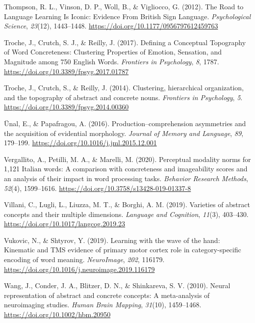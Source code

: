 \documentclass[
  man,floatsintext]{apa6}
\newlength{\cslhangindent}
\newenvironment{CSLReferences}[2] %
 {\begin{list}{}{%
  \setlength{\itemindent}{0pt}
  \setlength{\leftmargin}{0pt}
  \setlength{\parsep}{0pt}
  \ifodd #1
   \setlength{\leftmargin}{\cslhangindent}
   \setlength{\itemindent}{-1\cslhangindent}
  \fi
  \setlength{\itemsep}{#2\baselineskip}}}
 {\end{list}}
\begin{document}
\begin{CSLReferences}{1}{0}
Thompson, R. L., Vinson, D. P., Woll, B., \& Vigliocco, G. (2012). The {Road} to {Language Learning Is Iconic}: {Evidence From British Sign Language}. \emph{Psychological Science}, \emph{23}(12), 1443--1448. \url{https://doi.org/10.1177/0956797612459763}

Troche, J., Crutch, S. J., \& Reilly, J. (2017). Defining a {Conceptual Topography} of {Word Concreteness}: {Clustering Properties} of {Emotion}, {Sensation}, and {Magnitude} among 750 {English Words}. \emph{Frontiers in Psychology}, \emph{8}, 1787. \url{https://doi.org/10.3389/fpsyg.2017.01787}

Troche, J., Crutch, S., \& Reilly, J. (2014). Clustering, hierarchical organization, and the topography of abstract and concrete nouns. \emph{Frontiers in Psychology}, \emph{5}. \url{https://doi.org/10.3389/fpsyg.2014.00360}

Ünal, E., \& Papafragou, A. (2016). Production--comprehension asymmetries and the acquisition of evidential morphology. \emph{Journal of Memory and Language}, \emph{89}, 179--199. \url{https://doi.org/10.1016/j.jml.2015.12.001}

Vergallito, A., Petilli, M. A., \& Marelli, M. (2020). Perceptual modality norms for 1,121 {Italian} words: {A} comparison with concreteness and imageability scores and an analysis of their impact in word processing tasks. \emph{Behavior Research Methods}, \emph{52}(4), 1599--1616. \url{https://doi.org/10.3758/s13428-019-01337-8}

Villani, C., Lugli, L., Liuzza, M. T., \& Borghi, A. M. (2019). Varieties of abstract concepts and their multiple dimensions. \emph{Language and Cognition}, \emph{11}(3), 403--430. \url{https://doi.org/10.1017/langcog.2019.23}

Vukovic, N., \& Shtyrov, Y. (2019). Learning with the wave of the hand: {Kinematic} and {TMS} evidence of primary motor cortex role in category-specific encoding of word meaning. \emph{NeuroImage}, \emph{202}, 116179. \url{https://doi.org/10.1016/j.neuroimage.2019.116179}

Wang, J., Conder, J. A., Blitzer, D. N., \& Shinkareva, S. V. (2010). Neural representation of abstract and concrete concepts: {A} meta-analysis of neuroimaging studies. \emph{Human Brain Mapping}, \emph{31}(10), 1459--1468. \url{https://doi.org/10.1002/hbm.20950}


\end{CSLReferences}
\end{document}
